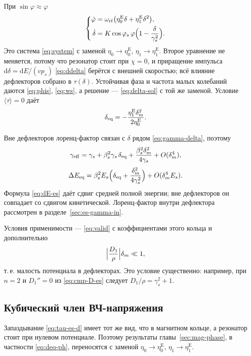 При $\sin\varphi\approx\varphi$
\begin{equation}
\label{eq:system-es}
\left\{
\begin{aligned}
\dot\varphi
&=\omega_{\mathrm{rf}}\bigl(\eta_0^{\mathrm{E}}\delta+\eta_1^{\mathrm{E}}\delta^2\bigr),\\
\dot\delta
&=K\cos\varphi_s\,\varphi\Bigl(1-\frac{\delta}{\gamma_s^2}\Bigr).
\end{aligned}
\right.
\end{equation}
Это система \eqref{eq:system} с заменой $\eta_0\to\eta_0^{\mathrm{E}}$, $\eta_1\to\eta_1^{\mathrm{E}}$. Второе уравнение не меняется, потому что резонатор стоит при $\chi=0$, и приращение импульса $\mathrm{d}\delta=\mathrm{d}E/(vp_s)$ \eqref{eq:ddelta} берётся с внешней скоростью; всё влияние дефлекторов собрано в $\tau(\delta)$. Устойчивая фаза и частота малых колебаний даются \eqref{eq:phis}, \eqref{eq:ws}, а решение --- \eqref{eq:delta-sol} с той же заменой. Условие $\langle\tau\rangle=0$ даёт
\begin{equation}
\label{eq:deq-es}
\delta_{\mathrm{eq}}=-\frac{\eta_1^{\mathrm{E}}\delta_m^2}{2\eta_0^{\mathrm{E}}}.
\end{equation}

Вне дефлекторов лоренц-фактор связан с $\delta$ рядом \eqref{eq:gamma-delta}, поэтому
\begin{equation}
\label{eq:gamma-eff-es}
\gamma_{\mathrm{eff}}
=\gamma_s+\beta_s^2\gamma_s\,\delta_{\mathrm{eq}}
+\frac{\beta_s^2\delta_m^2}{4\gamma_s}
+O(\delta_m^4),
\end{equation}
\begin{equation}
\label{eq:dE-es}
\Delta E_{\mathrm{eq}}
=\beta_s^2E_s\Bigl(
\delta_{\mathrm{eq}}+\frac{\delta_m^2}{4\gamma_s^2}
\Bigr)
+O(\delta_m^4 E_s).
\end{equation}
Формула \eqref{eq:dE-es} даёт сдвиг средней полной энергии; вне дефлекторов он совпадает со сдвигом кинетической. Лоренц-фактор внутри дефлектора рассмотрен в разделе~\ref{sec:es-gamma-in}.

Условия применимости --- \eqref{eq:valid} с коэффициентами этого кольца и дополнительно
\begin{equation}
\label{eq:valid-es}
\Bigl|\frac{D_1}{\rho}\Bigr|\delta_m\ll 1,
\end{equation}
т.\,е. малость потенциала в дефлекторах. Это условие существенно: например, при $n=2$ и $D_1''=0$ из \eqref{eq:cmp-D-es} следует $D_1/\rho=\gamma_s^2+1$.

\subsection{Кубический член ВЧ-напряжения}

Запаздывание \eqref{eq:tau-es-d} имеет тот же вид, что в магнитном кольце, а резонатор стоит при нулевом потенциале. Поэтому результаты главы~\ref{sec:mag-phase}, в частности \eqref{eq:deq-ph}, переносятся с заменой $\eta_0\to\eta_0^{\mathrm{E}}$, $\eta_1\to\eta_1^{\mathrm{E}}$.
